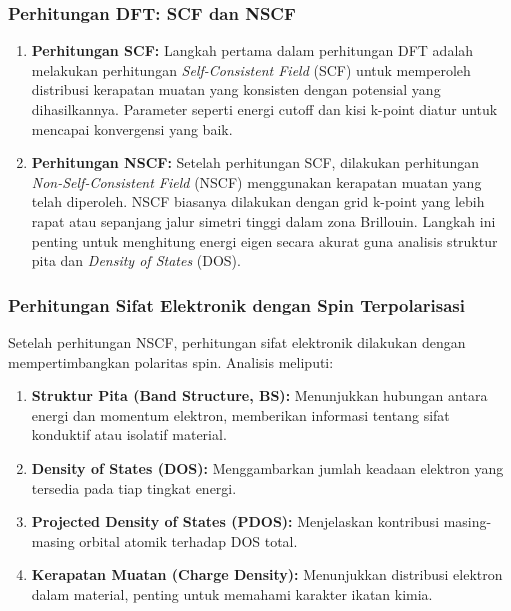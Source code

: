 \subsubsection*{Perhitungan DFT: SCF dan NSCF}
\label{sec:dft_calculations}
\begin{enumerate}
    \item \textbf{Perhitungan SCF:} Langkah pertama dalam perhitungan DFT adalah melakukan perhitungan \textit{Self-Consistent Field} (SCF) untuk memperoleh distribusi kerapatan muatan yang konsisten dengan potensial yang dihasilkannya. Parameter seperti energi cutoff dan kisi k-point diatur untuk mencapai konvergensi yang baik.
    \item \textbf{Perhitungan NSCF:} Setelah perhitungan SCF, dilakukan perhitungan \textit{Non-Self-Consistent Field} (NSCF) menggunakan kerapatan muatan yang telah diperoleh. NSCF biasanya dilakukan dengan grid k-point yang lebih rapat atau sepanjang jalur simetri tinggi dalam zona Brillouin. Langkah ini penting untuk menghitung energi eigen secara akurat guna analisis struktur pita dan \textit{Density of States} (DOS).
\end{enumerate}

\subsubsection*{Perhitungan Sifat Elektronik dengan Spin Terpolarisasi}
\label{sec:electronic_properties}
Setelah perhitungan NSCF, perhitungan sifat elektronik dilakukan dengan mempertimbangkan polaritas spin. Analisis meliputi:
\begin{enumerate}
    \item \textbf{Struktur Pita (Band Structure, BS):} Menunjukkan hubungan antara energi dan momentum elektron, memberikan informasi tentang sifat konduktif atau isolatif material.
    \item \textbf{Density of States (DOS):} Menggambarkan jumlah keadaan elektron yang tersedia pada tiap tingkat energi.
    \item \textbf{Projected Density of States (PDOS):} Menjelaskan kontribusi masing-masing orbital atomik terhadap DOS total.
    \item \textbf{Kerapatan Muatan (Charge Density):} Menunjukkan distribusi elektron dalam material, penting untuk memahami karakter ikatan kimia.
\end{enumerate}
